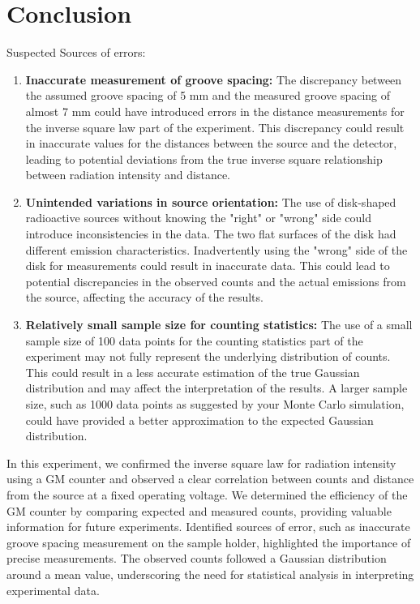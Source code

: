 \section{Conclusion}

	Suspected Sources of errors:
	\begin{enumerate}
		\item \textbf{Inaccurate measurement of groove spacing:} The discrepancy between the assumed groove spacing of 5 mm and the measured groove spacing of almost 7 mm could have introduced errors in the distance measurements for the inverse square law part of the experiment. This discrepancy could result in inaccurate values for the distances between the source and the detector, leading to potential deviations from the true inverse square relationship between radiation intensity and distance.
		\item \textbf{Unintended variations in source orientation:} The use of disk-shaped radioactive sources without knowing the "right" or "wrong" side could introduce inconsistencies in the data. The two flat surfaces of the disk had different emission characteristics. Inadvertently using the "wrong" side of the disk for measurements could result in inaccurate data. This could lead to potential discrepancies in the observed counts and the actual emissions from the source, affecting the accuracy of the results.
		\item \textbf{Relatively small sample size for counting statistics:} The use of a small sample size of 100 data points for the counting statistics part of the experiment may not fully represent the underlying distribution of counts. This could result in a less accurate estimation of the true Gaussian distribution and may affect the interpretation of the results. A larger sample size, such as 1000 data points as suggested by your Monte Carlo simulation, could have provided a better approximation to the expected Gaussian distribution.
	\end{enumerate}

	In this experiment, we confirmed the inverse square law for radiation intensity using a GM counter and observed a clear correlation between counts and distance from the source at a fixed operating voltage. We determined the efficiency of the GM counter by comparing expected and measured counts, providing valuable information for future experiments. Identified sources of error, such as inaccurate groove spacing measurement on the sample holder, highlighted the importance of precise measurements. The observed counts followed a Gaussian distribution around a mean value, underscoring the need for statistical analysis in interpreting experimental data.